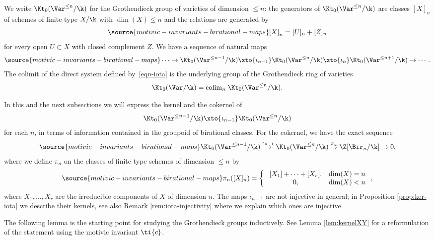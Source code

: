 We write $\Kt_0(\Var^{\le n}/\k)$ for the Grothendieck
group of varieties of dimension $\le n$: the generators
of $\Kt_0(\Var^{\le n}/\k)$
are
classes $[X]_n$
of schemes of finite type $X/\k$ with $\dim(X) \le n$
and the relations
are generated by
\begin{equation}\label{eq:cut-and-paste}
\source{motivic-invariants-birational-maps}
[X]_n = [U]_n + [Z]_n
\end{equation}
for every open $U \subset X$ with closed complement $Z$.
We have a sequence of natural maps
\begin{equation}\label{eqn-iota}
\source{motivic-invariants-birational-maps}
    \cdots \to \Kt_0(\Var^{\le n-1}/\k) \xto{\iota_{n-1}} \Kt_0(\Var^{\le n}/\k) \xto{\iota_{n}} \Kt_0(\Var^{\le n+1}/\k) \to \cdots.
\end{equation}
The colimit of the direct system defined by~\eqref{eqn-iota}
is the underlying group of
the Grothendieck ring of varieties
\[
\Kt_0(\Var/\k) = \mathrm{colim}_n \; \Kt_0(\Var^{\le n}/\k).
\]

In this and the next subsections
we will express the kernel and the cokernel of
$$\Kt_0(\Var^{\le n-1}/\k) \xto{\iota_{n-1}} \Kt_0(\Var^{\le n}/\k)$$
for each $n$,
in terms of information contained in
the groupoid of birational classes.
For the cokernel, we have the exact sequence
\begin{equation}\label{eq:K0-seq}
\source{motivic-invariants-birational-maps}
\Kt_0(\Var^{\le n-1}/\k) \overset{\iota_{n-1}}\to \Kt_0(\Var^{\le n}/\k) \overset{\pi_n}\to \Z[\Bir_n/\k] \to 0,
\end{equation}
where
we define
$\pi_n$
on
the classes of
finite type schemes
of dimension $\le n$ by
\begin{equation}
\label{eq:def-pi}
\source{motivic-invariants-birational-maps}
\pi_n([X]_n) = \left\{\begin{array}{cc}
     \; [X_1] + \cdots + [X_r], & \dim(X) = n \\
     \; 0, & \dim(X) < n \\
\end{array}\right.,
\end{equation}
where $X_1,\ldots,X_r$ are the irreducible components of $X$ of dimension $n$.
The maps $\iota_{n-1}$ are not injective in general;
in Proposition \ref{prop:ker-iota} we describe their kernels,
see also Remark \ref{rem:iota-injectivity} where we explain
which ones are injective.

The following lemma
is the starting point
for studying the Grothendieck groups inductively.
See Lemma
\ref{lem:kernelXY}
for a reformulation of the statement using the motivic invariant
$\ti{c}$.

